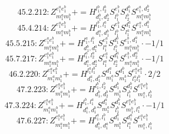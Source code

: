 \documentclass[letterpaper,10pt,fleqn,leqno,onecolumn]{article}
\begin{document}
\begin{equation} \;\;\;\;\;\;  45.2.212: Z^{e_{1}^{a}e_{1}^{b}}_{m_{1}^{a}m_{1}^{b}}+=H^{l_{1}^{b},l_{2}^{b}}_{d_{1}^{b},d_{2}^{b}}S^{e_{1}^{b}}_{l_{1}^{b}}S^{d_{1}^{b}}_{l_{2}^{b}}S^{e_{1}^{a},d_{2}^{b}}_{m_{1}^{a}m_{1}^{b}} \end{equation}
\begin{equation} \;\;\;\;\;\;  45.4.214: Z^{e_{1}^{a}e_{1}^{b}}_{m_{1}^{a}m_{1}^{b}}+=H^{l_{1}^{b},l_{1}^{a}}_{d_{1}^{a},d_{1}^{b}}S^{e_{1}^{b}}_{l_{1}^{b}}S^{d_{1}^{a}}_{l_{1}^{a}}S^{e_{1}^{a},d_{1}^{b}}_{m_{1}^{a}m_{1}^{b}} \end{equation}
\begin{equation} \;\;\;\;\;\;  45.5.215: Z^{e_{1}^{a}e_{1}^{b}}_{m_{1}^{a}m_{1}^{b}}+=H^{l_{1}^{a},l_{1}^{b}}_{d_{1}^{b},d_{1}^{a}}S^{e_{1}^{a}}_{l_{1}^{a}}S^{d_{1}^{b}}_{l_{1}^{b}}S^{e_{1}^{b},d_{1}^{a}}_{m_{1}^{a}m_{1}^{b}}\cdot -1/1 \end{equation}
\begin{equation} \;\;\;\;\;\;  45.7.217: Z^{e_{1}^{a}e_{1}^{b}}_{m_{1}^{a}m_{1}^{b}}+=H^{l_{1}^{a},l_{2}^{a}}_{d_{1}^{a},d_{2}^{a}}S^{e_{1}^{a}}_{l_{1}^{a}}S^{d_{1}^{a}}_{l_{2}^{a}}S^{e_{1}^{b},d_{2}^{a}}_{m_{1}^{a}m_{1}^{b}}\cdot -1/1 \end{equation}
\begin{equation} \;\;\;\;\;\;  46.2.220: Z^{e_{1}^{a}e_{1}^{b}}_{m_{1}^{a}m_{1}^{b}}+=H^{l_{1}^{a}l_{1}^{b}}_{d_{1}^{a},d_{1}^{b}}S^{d_{1}^{a}}_{m_{1}^{a}}S^{d_{1}^{b}}_{m_{1}^{b}}S^{e_{1}^{a}e_{1}^{b}}_{l_{1}^{a}l_{1}^{b}}\cdot 2/2 \end{equation}
\begin{equation} \;\;\;\;\;\;  47.2.223: Z^{e_{1}^{a}e_{1}^{b}}_{m_{1}^{a}m_{1}^{b}}+=H^{l_{1}^{b},l_{2}^{b}}_{d_{1}^{b},d_{2}^{b}}S^{d_{1}^{b}}_{m_{1}^{b}}S^{d_{2}^{b}}_{l_{1}^{b}}S^{e_{1}^{a}e_{1}^{b}}_{m_{1}^{a},l_{2}^{b}} \end{equation}
\begin{equation} \;\;\;\;\;\;  47.3.224: Z^{e_{1}^{a}e_{1}^{b}}_{m_{1}^{a}m_{1}^{b}}+=H^{l_{1}^{b},l_{1}^{a}}_{d_{1}^{a},d_{1}^{b}}S^{d_{1}^{a}}_{m_{1}^{a}}S^{d_{1}^{b}}_{l_{1}^{b}}S^{e_{1}^{a}e_{1}^{b}}_{m_{1}^{b},l_{1}^{a}}\cdot -1/1 \end{equation}
\begin{equation} \;\;\;\;\;\;  47.6.227: Z^{e_{1}^{a}e_{1}^{b}}_{m_{1}^{a}m_{1}^{b}}+=H^{l_{1}^{a},l_{1}^{b}}_{d_{1}^{b},d_{1}^{a}}S^{d_{1}^{b}}_{m_{1}^{b}}S^{d_{1}^{a}}_{l_{1}^{a}}S^{e_{1}^{a}e_{1}^{b}}_{m_{1}^{a},l_{1}^{b}} \end{equation}
\end{document}
